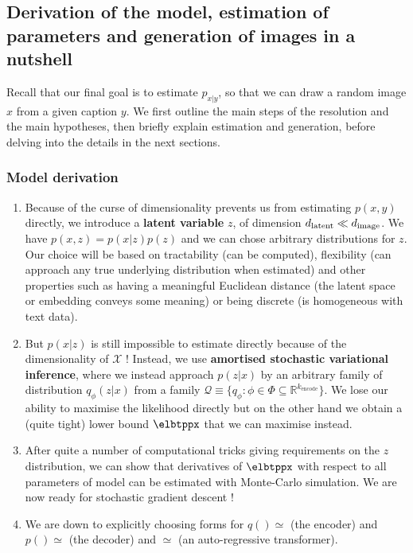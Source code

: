 \documentclass{article}
\begin{document}
\begin{appendix}
\subsection{Derivation of the model, estimation of parameters and generation of images in a nutshell}

Recall that our final goal is to estimate $p_{x|y}$, so that we can draw a random image $x$ from a given caption $y$. We first outline the main steps of the resolution and the main hypotheses, then briefly explain estimation and generation, before delving into the details in the next sections.

\subsubsection{Model derivation}

\begin{enumerate}
    \item Because of the curse of dimensionality prevents us from estimating $p(x,y)$ directly, we introduce a \textbf{latent variable} $z$, of dimension ${d_{\mathrm{latent}}} \ll d_{\mathrm{image}}$. We have $p(x,z)=p(x|z)p(z)$ and we can chose arbitrary distributions for $z$. Our choice will be based on tractability (can be computed), flexibility (can approach any true underlying distribution when estimated) and other properties such as having a meaningful Euclidean distance (the latent space or embedding conveys some meaning) or being discrete (is homogeneous with text data).
    \item But $p(x|z)$ is still impossible to estimate directly because of the dimensionality of $\mathcal{X}$ ! Instead, we use \textbf{amortised stochastic variational inference}, where we instead approach $p(z|x)$ by an arbitrary family of distribution $q_\phi(z|x)$ from a family $\mathcal{Q}\equiv\{q_\phi : \phi\in\Phi\subseteq \mathbb{R}^{k_{\mathrm{encode}}}\}$. We lose our ability to maximise the likelihood directly but on the other hand we obtain a (quite tight) lower bound $\elbtppx$ that we can maximise instead.
    \item After quite a number of computational tricks giving requirements on the $z$ distribution, we can show that derivatives of $\elbtppx$ with respect to all parameters of model can be estimated with Monte-Carlo simulation. We are now ready for stochastic gradient descent !
    \item We are down to explicitly choosing forms for $q()\simeq $ (the encoder) and  $p() \simeq $ (the decoder) and  $\simeq $ (an auto-regressive transformer).
\end{enumerate}


\end{appendix}
\end{document}
